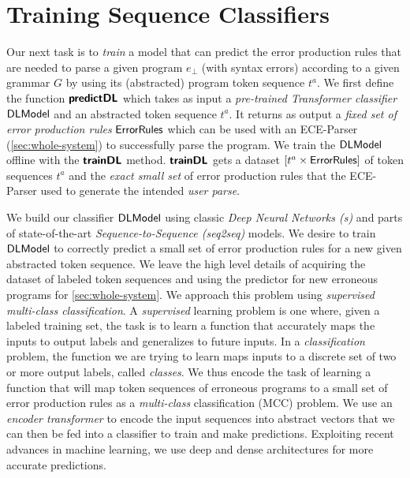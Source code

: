 \section{Training Sequence Classifiers}
\label{sec:seq-classifiers}

Our next task is to \emph{train} a model that can predict the error production
rules that are needed to parse a given program $e_{\bot}$ (with syntax errors)
according to a given grammar $G$ by using its (abstracted) program token
sequence $t^a$.
%
We first define the function $\bm{\mathsf{predictDL}}$ which takes as input a
\emph{pre-trained Transformer classifier} $\mathsf{DLModel}$ and an abstracted token
sequence $t^a$.
%
It returns as output a \emph{fixed set of error production rules}
$\mathsf{ErrorRules}$ which can be used with an ECE-Parser
(\autoref{sec:whole-system}) to successfully parse the program.
%
We train the $\mathsf{DLModel}$ offline with the $\bm{\mathsf{trainDL}}$ method. $\bm{\mathsf{trainDL}}$ gets
a dataset $[t^a \times \mathsf{ErrorRules}]$ of token sequences $t^a$ and the
\emph{exact small set} of error production rules that the ECE-Parser used to
generate the intended \emph{user parse}.

We build our classifier $\mathsf{DLModel}$ using classic \emph{Deep Neural Networks
(\dnn{}s)} and parts of state-of-the-art \emph{Sequence-to-Sequence (seq2seq)}
models. We desire to train $\mathsf{DLModel}$ to correctly predict a small set of error
production rules for a new given abstracted token sequence. We leave the high
level details of acquiring the dataset of labeled token sequences and using the
predictor for new erroneous programs for \autoref{sec:whole-system}. We approach
this problem using \emph{supervised multi-class classification}. A
\emph{supervised} learning problem is one where, given a labeled training set,
the task is to learn a function that accurately maps the inputs to output labels
and generalizes to future inputs. In a \emph{classification} problem, the
function we are trying to learn maps inputs to a discrete set of two or more
output labels, called \emph{classes}. We thus encode the task of learning a
function that will map token sequences of erroneous programs to a small set of
error production rules as a \emph{multi-class} classification (MCC) problem. We
use an \emph{encoder transformer} to encode the input sequences into abstract
vectors that we can then be fed into a \emph{\dnn} classifier to train and make
predictions. Exploiting recent advances in machine learning, we use deep and
dense architectures \citep{Schmidhuber_2015} for more accurate predictions.

